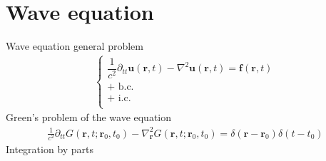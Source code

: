 \documentclass[letterpaper,10pt,english]{jupyterBook}
\begin{document}
\section{Wave equation}
\label{\detokenize{ch/pde/bem-poisson-helmholtz-waves:wave-equation}}\label{\detokenize{ch/pde/bem-poisson-helmholtz-waves:classical-electromagnetism-green-function-waves}}
\sphinxAtStartPar
Wave equation general problem
\begin{equation*}
\begin{split}\begin{cases}
  \dfrac{1}{c^2} \partial_{tt} \mathbf{u}(\mathbf{r},t) - \nabla^2 \mathbf{u}(\mathbf{r},t) = \mathbf{f}(\mathbf{r},t) \\
  \text{+ b.c.} \\
  \text{+ i.c.} \\
\end{cases}\end{split}
\end{equation*}
\sphinxAtStartPar
Green’s problem of the wave equation
\begin{equation*}
\begin{split}\frac{1}{c^2} \partial_{tt} G(\mathbf{r},t;\mathbf{r}_0,t_0) - \nabla_{\mathbf{r}}^2 G(\mathbf{r},t;\mathbf{r}_0,t_0) = \delta(\mathbf{r}-\mathbf{r}_0) \delta(t-t_0)\end{split}
\end{equation*}
\sphinxAtStartPar
Integration by parts
\end{document}
